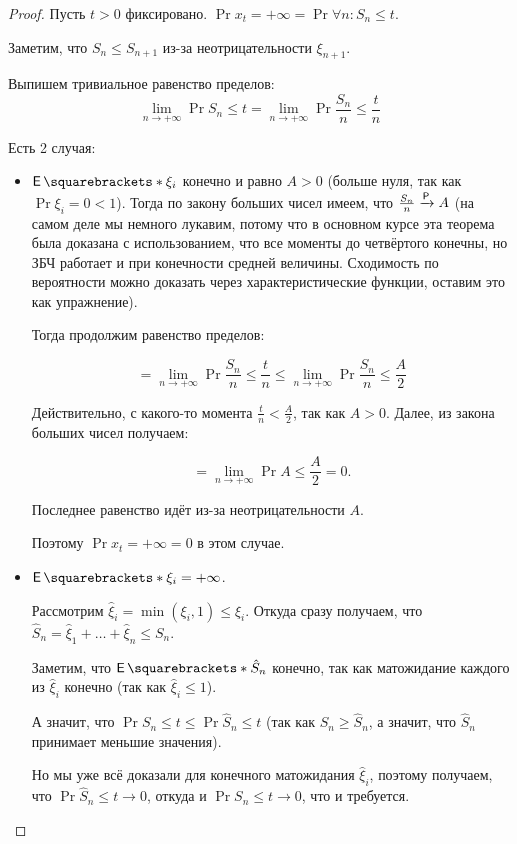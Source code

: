 \begin{proof}
  Пусть $t > 0$ фиксировано. $\Pr{x_t = +\infty} = \Pr{\forall n : S_n \leq t}$.

  Заметим, что $S_n \leq S_{n + 1}$ из-за неотрицательности $\xi_{n + 1}$.

  Выпишем тривиальное равенство пределов:
  \[
    \lim\limits_{n \to +\infty} \Pr{S_n \leq t} = \lim\limits_{n \to +\infty} \Pr{\frac{S_n}{n} \leq \frac{t}{n}}
  \]

  Есть 2 случая:

  \begin{itemize}
    \item $\E{\xi_i}$ конечно и равно $A > 0$ (больше нуля, так как $\Pr{\xi_i = 0} < 1$).
    Тогда по закону больших чисел имеем,
    что $\frac{S_n}{n} \prto A$ (на самом деле мы немного лукавим, потому что
    в основном курсе эта теорема была доказана с использованием, что все моменты до четвёртого конечны,
    но ЗБЧ работает и при конечности средней величины. Сходимость по вероятности можно
    доказать через характеристические функции, оставим это как упражнение).

    Тогда продолжим равенство пределов:

    \[
      = \lim\limits_{n \to +\infty} \Pr{\frac{S_n}{n} \leq \frac{t}{n}} \leq
      \lim\limits_{n \to +\infty} \Pr{\frac{S_n}{n} \leq \frac{A}{2}}
    \]

    Действительно, с какого-то момента $\frac{t}{n} < \frac{A}{2}$, так как
    $A > 0$. Далее, из закона больших чисел получаем:

    \[
      = \lim\limits_{n \to +\infty} \Pr{A \leq \frac{A}{2}} = 0.
    \]

    Последнее равенство идёт из-за неотрицательности $A$.

    Поэтому $\Pr{x_t = +\infty} = 0$ в этом случае.

    \item $\E{\xi_i} = +\infty$.

    Рассмотрим $\hat{\xi}_i = \min(\xi_i, 1) \leq \xi_i$. Откуда сразу получаем,
    что $\hat{S}_n = \hat{\xi}_1 + \ldots + \hat{\xi}_n \leq S_n$.

    Заметим, что $\E{\hat{S}_n}$ конечно, так как матожидание каждого из
    $\hat{\xi}_i$ конечно (так как $\hat{\xi}_i \leq 1$).

    А значит, что $\Pr{S_n \leq t} \leq \Pr{\hat{S}_n \leq t}$ (так как
    $S_n \geq \hat{S}_n$, а значит, что $\hat{S}_n$ принимает меньшие значения).

    Но мы уже всё доказали для конечного матожидания $\hat{\xi}_i$, поэтому получаем,
    что $\Pr{\hat{S}_n \leq t} \to 0$, откуда и $\Pr{S_n \leq t} \to 0$, что и требуется.
  \end{itemize}

\end{proof}

